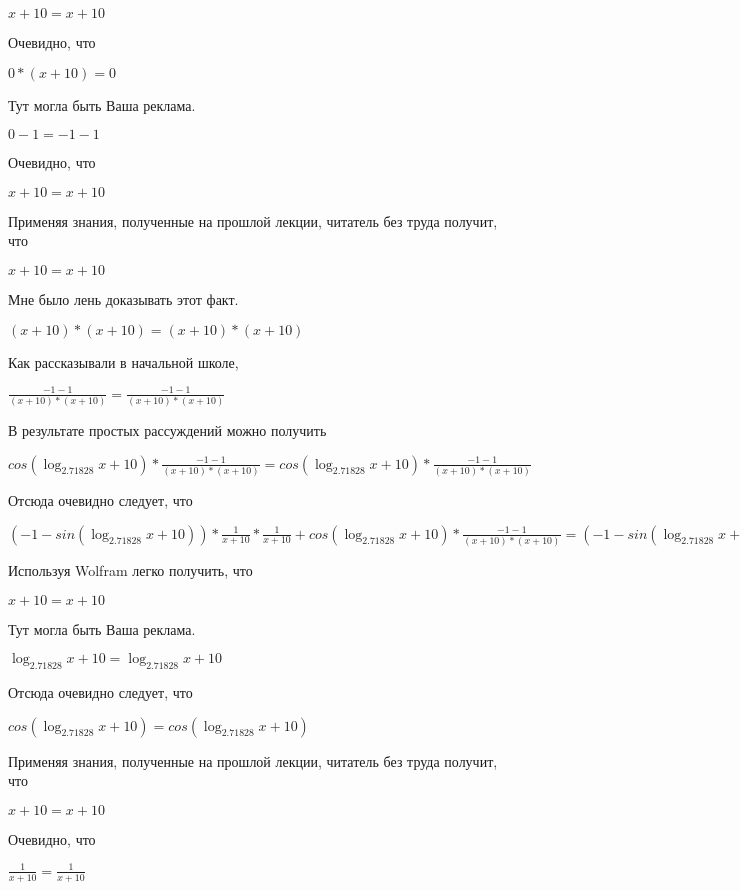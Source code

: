 \documentclass[12pt,a4paper,fleqn]{article}
\theoremstyle{definition}
\begin{document}
$ x  +  10  =  x  +  10 $

Очевидно, что 

$ 0  * ( x  +  10 ) =  0 $

Тут могла быть Ваша реклама. 

$ 0  -  1  =  -1  -  1 $

Очевидно, что 

$ x  +  10  =  x  +  10 $

Применяя знания, полученные на прошлой лекции, читатель без труда получит, что 

$ x  +  10  =  x  +  10 $

Мне было лень доказывать этот факт.

$( x  +  10 ) * ( x  +  10 ) = ( x  +  10 ) * ( x  +  10 )$

Как рассказывали в начальной школе, 

$\frac{ -1  -  1 }{( x  +  10 ) * ( x  +  10 )}
 = \frac{ -1  -  1 }{( x  +  10 ) * ( x  +  10 )}
$

В результате простых рассуждений можно получить 

$cos(\log_{ 2.71828 }{ x  +  10 }) * \frac{ -1  -  1 }{( x  +  10 ) * ( x  +  10 )}
 = cos(\log_{ 2.71828 }{ x  +  10 }) * \frac{ -1  -  1 }{( x  +  10 ) * ( x  +  10 )}
$

Отсюда очевидно следует, что 

$( -1  - sin(\log_{ 2.71828 }{ x  +  10 })) * \frac{ 1 }{ x  +  10 }
 * \frac{ 1 }{ x  +  10 }
 + cos(\log_{ 2.71828 }{ x  +  10 }) * \frac{ -1  -  1 }{( x  +  10 ) * ( x  +  10 )}
 = ( -1  - sin(\log_{ 2.71828 }{ x  +  10 })) * \frac{ 1 }{ x  +  10 }
 * \frac{ 1 }{ x  +  10 }
 + cos(\log_{ 2.71828 }{ x  +  10 }) * \frac{ -1  -  1 }{( x  +  10 ) * ( x  +  10 )}
$

Используя Wolfram легко получить, что 

$ x  +  10  =  x  +  10 $

Тут могла быть Ваша реклама. 

$\log_{ 2.71828 }{ x  +  10 } = \log_{ 2.71828 }{ x  +  10 }$

Отсюда очевидно следует, что 

$cos(\log_{ 2.71828 }{ x  +  10 }) = cos(\log_{ 2.71828 }{ x  +  10 })$

Применяя знания, полученные на прошлой лекции, читатель без труда получит, что 

$ x  +  10  =  x  +  10 $

Очевидно, что 

$\frac{ 1 }{ x  +  10 }
 = \frac{ 1 }{ x  +  10 }
$
\end{document}
